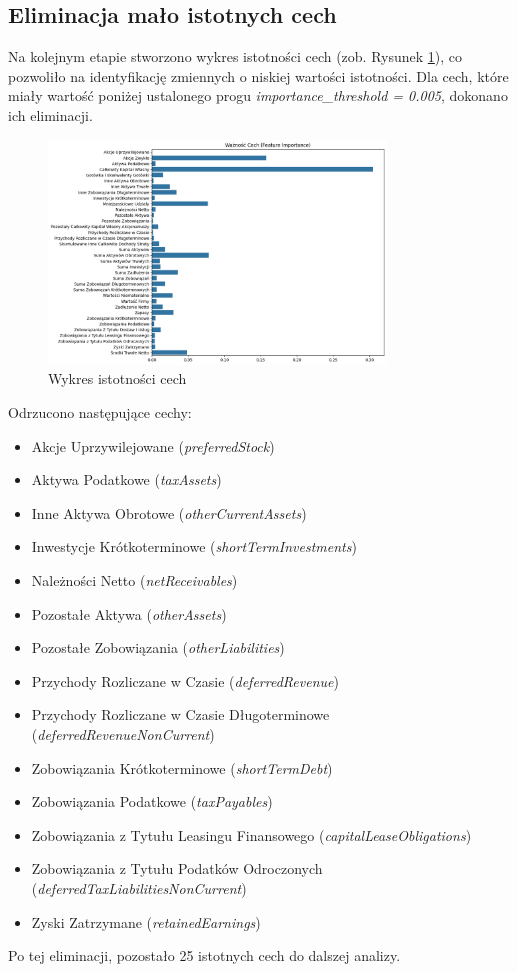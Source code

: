\documentclass[12pt]{article}
\begin{document}
\subsection{Eliminacja mało istotnych cech}

Na kolejnym etapie stworzono wykres istotności cech (zob. Rysunek \ref{fig:feature_importance}), co pozwoliło na identyfikację zmiennych o niskiej wartości istotności. Dla cech, które miały wartość poniżej ustalonego progu \emph{importance\_threshold = 0.005}, dokonano ich eliminacji.

\begin{figure}[h]
    \centering
    \includegraphics[width=0.8\textwidth]{docs/img/feature-importances.png}
    \caption{Wykres istotności cech}
    \label{fig:feature_importance}
\end{figure}

Odrzucono następujące cechy:
\begin{itemize}
    \item Akcje Uprzywilejowane (\emph{preferredStock})
    \item Aktywa Podatkowe (\emph{taxAssets})
    \item Inne Aktywa Obrotowe (\emph{otherCurrentAssets})
    \item Inwestycje Krótkoterminowe (\emph{shortTermInvestments})
    \item Należności Netto (\emph{netReceivables})
    \item Pozostałe Aktywa (\emph{otherAssets})
    \item Pozostałe Zobowiązania (\emph{otherLiabilities})
    \item Przychody Rozliczane w Czasie (\emph{deferredRevenue})
    \item Przychody Rozliczane w Czasie Długoterminowe (\emph{deferredRevenueNonCurrent})
    \item Zobowiązania Krótkoterminowe (\emph{shortTermDebt})
    \item Zobowiązania Podatkowe (\emph{taxPayables})
    \item Zobowiązania z Tytułu Leasingu Finansowego (\emph{capitalLeaseObligations})
    \item Zobowiązania z Tytułu Podatków Odroczonych (\emph{deferredTaxLiabilitiesNonCurrent})
    \item Zyski Zatrzymane (\emph{retainedEarnings})
\end{itemize}

Po tej eliminacji, pozostało 25 istotnych cech do dalszej analizy.
\end{document}
